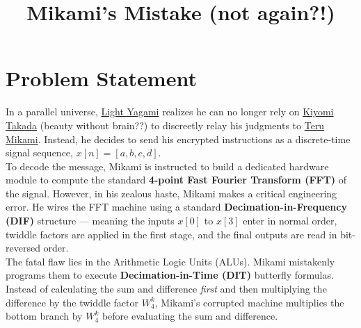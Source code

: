 \documentclass[12pt]{article}
\title{Mikami's Mistake (not again?!)}
\author{}
\date{}
\begin{document}
\maketitle

\section*{Problem Statement}

In a parallel universe, \href{https://deathnote.fandom.com/wiki/Light_Yagami}{Light Yagami} realizes he can no longer rely on \href{https://deathnote.fandom.com/wiki/Kiyomi_Takada}{Kiyomi Takada} (beauty without brain??) to discreetly relay his judgments to \href{https://deathnote.fandom.com/wiki/Teru_Mikami}{Teru Mikami}. Instead, he decides to send his encrypted instructions as a discrete-time signal sequence,  $x[n]=[a,b,c,d]$.\\

To decode the message, Mikami is instructed to build a dedicated hardware module to compute the standard \textbf{4-point Fast Fourier Transform (FFT)} of the signal. However, in his zealous haste, Mikami makes a critical engineering error. He wires the FFT machine using a standard \textbf{Decimation-in-Frequency (DIF)} structure — meaning the inputs $x[0]$ to $x[3]$ enter in normal order, twiddle factors are applied in the first stage, and the final outputs are read in bit-reversed order.\\

The fatal flaw lies in the Arithmetic Logic Units (ALUs). Mikami mistakenly programs them to execute \textbf{Decimation-in-Time (DIT)} butterfly formulas. Instead of calculating the sum and difference \emph{first} and then multiplying the difference by the twiddle factor $W_4^k$, Mikami’s corrupted machine multiplies the bottom branch by $W_4^k$ before evaluating the sum and difference.
\end{document}
